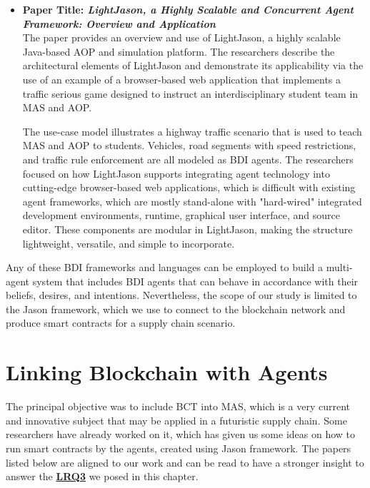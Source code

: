\begin{itemize}[label={}]
\vspace{.5cm}

\item \textbf{Paper Title: \textit{LightJason, a Highly Scalable and Concurrent Agent Framework: Overview and Application}}\\

The paper \cite{lightjason} provides an overview and use of LightJason, a highly scalable Java-based \ac{AOP} and simulation platform. The researchers describe the architectural elements of LightJason and demonstrate its applicability via the use of an example of a browser-based web application that implements a traffic serious game designed to instruct an interdisciplinary student team in \ac{MAS} and \ac{AOP}.

\vspace{.5cm}

The use-case model illustrates a highway traffic scenario that is used to teach \ac{MAS} and \ac{AOP} to students. Vehicles, road segments with speed restrictions, and traffic rule enforcement are all modeled as \ac{BDI} agents. The researchers focused on how LightJason supports integrating agent technology into cutting-edge browser-based web applications, which is difficult with existing agent frameworks, which are mostly stand-alone with "hard-wired" integrated development environments, runtime, graphical user interface, and source editor. These components are modular in LightJason, making the structure lightweight, versatile, and simple to incorporate.

\end{itemize}

 Any of these \ac{BDI} frameworks and languages can be employed to build a multi-agent system that includes \ac{BDI} agents that can behave in accordance with their beliefs, desires, and intentions. Nevertheless, the scope of our study is limited to the Jason framework, which we use to connect to the blockchain network and produce smart contracts for a supply chain scenario.

\section{Linking Blockchain with Agents}

The principal objective was to include \ac{BCT} into \ac{MAS}, which is a very current and innovative subject that may be applied in a futuristic supply chain. Some researchers have already worked on it, which has given us some ideas on how to run smart contracts by the agents, created using Jason framework. The papers listed below are aligned to our work and can be read to have a stronger insight to answer the \hyperref[LRQ3.]{\textbf{LRQ3}} we posed in this chapter.

